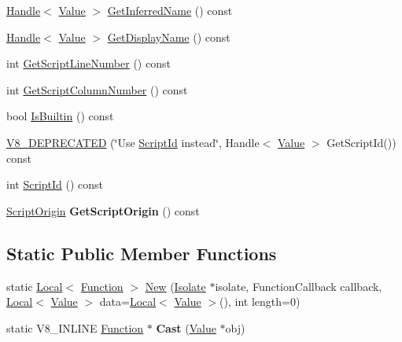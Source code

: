 \begin{DoxyCompactItemize}
\item 
\hyperlink{classv8_1_1_handle}{Handle}$<$ \hyperlink{classv8_1_1_value}{Value} $>$ \hyperlink{classv8_1_1_function_a5bd3ad2f8144be5d9b383b1cd9b30df5}{Get\+Inferred\+Name} () const 
\item 
\hyperlink{classv8_1_1_handle}{Handle}$<$ \hyperlink{classv8_1_1_value}{Value} $>$ \hyperlink{classv8_1_1_function_a02e860b1d4f1b58a0c437fec8ea9e290}{Get\+Display\+Name} () const 
\item 
int \hyperlink{classv8_1_1_function_ae64de1b9dc1ea5dc4f419a88808c12c5}{Get\+Script\+Line\+Number} () const 
\item 
int \hyperlink{classv8_1_1_function_abfe6a9251c5dfc995b83dcf3032fdc86}{Get\+Script\+Column\+Number} () const 
\item 
bool \hyperlink{classv8_1_1_function_a4279e2bfca281cda9afdaf86c87d644d}{Is\+Builtin} () const 
\item 
\hyperlink{classv8_1_1_function_abe7d67a37d118820d46d0b6e4f3ee50c}{V8\+\_\+\+D\+E\+P\+R\+E\+C\+A\+T\+E\+D} (\char`\"{}Use \hyperlink{classv8_1_1_function_afa208e62e702f6d61ba0a4250ba3f2cf}{Script\+Id} instead\char`\"{}, Handle$<$ \hyperlink{classv8_1_1_value}{Value} $>$ Get\+Script\+Id()) const 
\item 
int \hyperlink{classv8_1_1_function_afa208e62e702f6d61ba0a4250ba3f2cf}{Script\+Id} () const 
\item 
\hypertarget{classv8_1_1_function_af9c77c9bcbf698727071c7153e7c2513}{}\hyperlink{classv8_1_1_script_origin}{Script\+Origin} {\bfseries Get\+Script\+Origin} () const \label{classv8_1_1_function_af9c77c9bcbf698727071c7153e7c2513}

\end{DoxyCompactItemize}
\subsection*{Static Public Member Functions}
\begin{DoxyCompactItemize}
\item 
static \hyperlink{classv8_1_1_local}{Local}$<$ \hyperlink{classv8_1_1_function}{Function} $>$ \hyperlink{classv8_1_1_function_a56e303d1019aaa7954de668aee8486f7}{New} (\hyperlink{classv8_1_1_isolate}{Isolate} $\ast$isolate, Function\+Callback callback, \hyperlink{classv8_1_1_local}{Local}$<$ \hyperlink{classv8_1_1_value}{Value} $>$ data=\hyperlink{classv8_1_1_local}{Local}$<$ \hyperlink{classv8_1_1_value}{Value} $>$(), int length=0)
\item 
\hypertarget{classv8_1_1_function_af24f38bcc0769519816cda1f6a154ff8}{}static V8\+\_\+\+I\+N\+L\+I\+N\+E \hyperlink{classv8_1_1_function}{Function} $\ast$ {\bfseries Cast} (\hyperlink{classv8_1_1_value}{Value} $\ast$obj)\label{classv8_1_1_function_af24f38bcc0769519816cda1f6a154ff8}

\end{DoxyCompactItemize}

